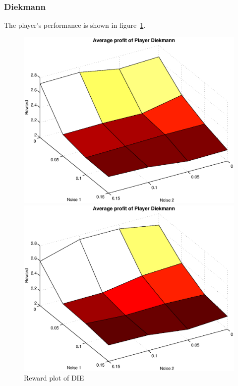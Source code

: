 \subsubsection{Diekmann}
The player's performance is shown in figure~\ref{pic player diekmann}.\\
\begin{figure}[h]
	\caption{Reward plot of DIE}
	\label{pic player diekmann}
\begin{minipage}[hbt]{0.65\textwidth}
	\centering
	\includegraphics[width=\textwidth]{pics/simulation1/Reward_vs_Noise_of_Player_Diekmann}
\end{minipage}
\hfill
\begin{minipage}[hbt]{0.3\textwidth}
	\centering
	\includegraphics[width=\textwidth]{pics/simulation2/Reward_vs_Noise_of_Player_Diekmann}
\end{minipage}

\end{figure}

